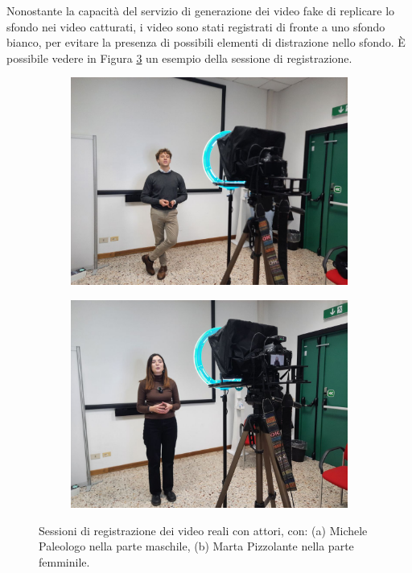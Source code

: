 Nonostante la capacità del servizio di generazione dei video fake di replicare lo sfondo nei video catturati, i video sono stati registrati di fronte a uno sfondo bianco, per evitare la presenza di possibili elementi di distrazione nello sfondo. È possibile vedere in Figura \ref{fig:recording_session} un esempio della sessione di registrazione.

\begin{figure}[t]
    \centering
    \begin{subfigure}{0.49\textwidth}
        \includegraphics[width=0.95\linewidth]{images/recording_m} 
        \caption{}
        \label{fig:recording_m}
    \end{subfigure}
    \hfill
    \begin{subfigure}{0.49\textwidth}
        \includegraphics[width=0.95\linewidth]{images/recording_f}
        \caption{}
        \label{fig:recording_f}
    \end{subfigure}
    \hfill
    \caption{Sessioni di registrazione dei video reali con attori, con: (a) Michele Paleologo nella parte maschile, (b) Marta Pizzolante nella parte femminile.}
    \label{fig:recording_session}
\end{figure}

